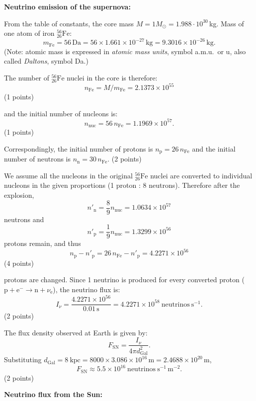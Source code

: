 \textbf{Neutrino emission of the supernova:}

From the table of constants, the core mass
$M = 1M_\odot = 1.988 \cdot 10^{30}$\,kg.
Mass of one atom of iron $^{56}_{26}\mathrm{Fe}$:
\[
  m_{\mathrm{Fe}} = 56\,\mathrm{Da}
  = 56 \times 1.661 \times 10^{-27}\,\mathrm{kg}
  = 9.3016 \times 10^{-26}\,\mathrm{kg}.
\]
(Note: atomic mass is expressed in \emph{atomic mass units}, symbol a.m.u.\ or
u, also called \emph{Daltons}, symbol Da.)

The number of $^{56}_{26}\mathrm{Fe}$ nuclei in the core is therefore:
\[
  n_{\mathrm{Fe}} = M/m_{\mathrm{Fe}} = 2.1373 \times 10^{55}
\]
\hfill(1 points)

and the initial number of nucleons is:
\[
  n_{\mathrm{nuc}} = 56\,n_{\mathrm{Fe}} = 1.1969 \times 10^{57}.
\]
\hfill(1 points)

Correspondingly, the initial number of protons is
$n_{\mathrm{p}} = 26\,n_{\mathrm{Fe}}$ and the initial number of neutrons is
$n_{\mathrm{n}} = 30\,n_{\mathrm{Fe}}$. \hfill(2 points)

We assume all the nucleons in the original $^{56}_{26}\mathrm{Fe}$ nuclei are
converted to individual nucleons in the given proportions
(1 proton : 8 neutrons). Therefore after the explosion,
\[
  n'_{\mathrm{n}} = \frac{8}{9} n_{\mathrm{nuc}} = 1.0634 \times 10^{57}
\]
neutrons and
\[
  n'_{\mathrm{p}} = \frac{1}{9} n_{\mathrm{nuc}} = 1.3299 \times 10^{56}
\]
protons remain, and thus
\[
  n_{\mathrm{p}} - n'_{\mathrm{p}} = 26\,n_{\mathrm{Fe}} - n'_{\mathrm{p}}
  = 4.2271 \times 10^{56}
\]
\hfill(4 points)

protons are changed. Since 1 neutrino is produced for every converted proton
($\mathrm{p} + \mathrm{e}^- \to \mathrm{n} + \nu_{\mathrm{e}}$), the neutrino
flux is:
\[
  I_\nu = \frac{4.2271 \times 10^{56}}{0.01\,\mathrm{s}}
  = 4.2271 \times 10^{58}\ \mathrm{neutrinos\ s^{-1}}.
\]
\hfill(2 points)

The flux density observed at Earth is given by:
\[
  F_{\mathrm{SN}} = \frac{I_\nu}{4\pi d_{\mathrm{Gal}}^2}.
\]
Substituting
$d_{\mathrm{Gal}} = 8\ \mathrm{kpc} = 8000 \times 3.086 \times 10^{16}\,\mathrm{m}
= 2.4688 \times 10^{20}\,\mathrm{m}$,
\[
  F_{\mathrm{SN}} \approx 5.5 \times 10^{16}\ \mathrm{neutrinos\ s^{-1}\,m^{-2}}.
\]
\hfill(2 points)

\textbf{Neutrino flux from the Sun:}

